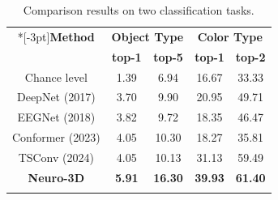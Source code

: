\begin{table}[t]
	\centering
	\renewcommand\arraystretch{1.0}
	\footnotesize
	\begin{tabular}{ c c  c  c  c}
		\Xhline{2\arrayrulewidth}
		
		\multirow{2}*[-3pt]{\textbf{Method}} 
		\rule{0pt}{2pt} & \multicolumn{2}{c}{\multirow{1}{*}[-1pt]{\textbf{\textbf{Object Type}}}}
		& \multicolumn{2}{c}{\multirow{1}{*}[-1pt]{\textbf{\textbf{Color Type}}}} \\ [-1.5pt]
		\cmidrule(l{5pt}r{5pt}){2-3}\cmidrule(l{5pt}r{5pt}){4-5}
		& \multirow{1}{*}[0.8pt]{\textbf{top-1}} & \multirow{1}{*}[0.8pt]{\textbf{top-5}}  & \multirow{1}{*}[0.8pt]{\textbf{top-1}} 
		& \multirow{1}{*}[0.8pt]{\textbf{top-2}}\\
		\hline
		\multirow{1}{*}{Chance level} 
		& 1.39  & 6.94 & 16.67 & 33.33 \\
		\hline
		\multirow{1}{*}{DeepNet (2017) \cite{schirrmeister2017deep}} 
		& 3.70  & 9.90 & 20.95 & 49.71 \\
		\multirow{1}{*}{EEGNet (2018) \cite{lawhern2018eegnet}} 
		& 3.82  & 9.72 & 18.35 & 46.47 \\
		\multirow{1}{*}{Conformer (2023) \cite{song2022eeg}} 
		& 4.05  & 10.30 & 18.27 & 35.81 \\
		\multirow{1}{*}{TSConv (2024) \cite{song2023decoding}} 
		& 4.05  & 10.13 & 31.13 & 59.49 \\ \hline
		\multirow{1}{*}{\textbf{Neuro-3D}} 
		& \textbf{5.91} & \textbf{16.30} & \textbf{39.93} & \textbf{61.40}\\
		\Xhline{2\arrayrulewidth}
	\end{tabular}
	\caption{Comparison results on two classification tasks.}
	\label{tab-classify}
	\vspace{-0.3cm}
\end{table}

